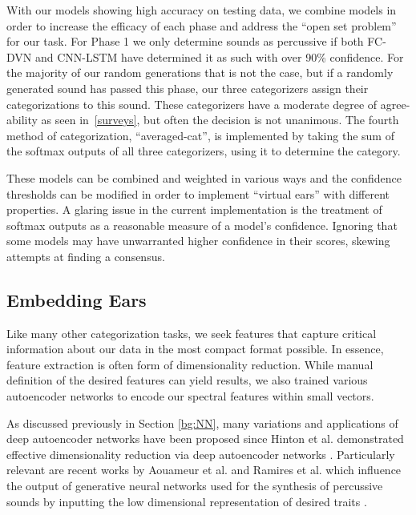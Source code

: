 \documentclass[\main/thesis.tex]{subfiles}
\begin{document}
With our models showing high accuracy on testing data, we combine models in order to increase the efficacy of each phase and address the \enquote{open set problem} for our task. For Phase 1 we only determine sounds as percussive if both FC-DVN and CNN-LSTM have determined it as such with over 90\% confidence. For the majority of our random generations that is not the case, but if a randomly generated sound has passed this phase, our three categorizers assign their categorizations to this sound. These categorizers have a moderate degree of agree-ability as seen in~\ref{surveys}, but often the decision is not unanimous. The fourth method of categorization, \enquote{averaged-cat}, is implemented by taking the sum of the softmax outputs of all three categorizers, using it to determine the category. 

These models can be combined and weighted in various ways and the confidence thresholds can be modified in order to implement \enquote{virtual ears} with different properties. A glaring issue in the current implementation is the treatment of softmax outputs as a reasonable measure of a model's confidence. Ignoring that some models may have unwarranted higher confidence in their scores, skewing attempts at finding a consensus. 


\subsection{Embedding Ears}
% 
Like many other categorization tasks, we seek features that capture critical information about our data in the most compact format possible. In essence, feature extraction is often form of dimensionality reduction. While manual definition of the desired features can yield results, we also trained various autoencoder networks to encode our spectral features within small vectors. 

As discussed previously in Section \ref{bg:NN}, many variations and applications of deep autoencoder networks have been proposed since Hinton et al. demonstrated effective dimensionality reduction via deep autoencoder networks \cite{hinton1994autoencoders,hinton2006reducing}. Particularly relevant are recent works by Aouameur et al. and Ramires et al. which influence the output of generative neural networks used for the synthesis of percussive sounds by inputting the low dimensional representation of desired traits \cite{aouameur2019neural,ramires2020neural}. 
\end{document}
